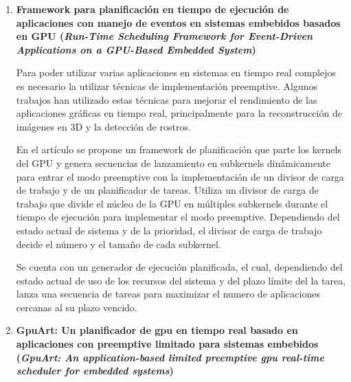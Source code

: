 \begin{enumerate}
\item \textbf{Framework para planificación en tiempo de ejecución de aplicaciones con manejo de eventos en sistemas embebidos basados en GPU 
	(\textit{Run-Time Scheduling Framework for Event-Driven Applications on a GPU-Based Embedded System})}
	
	Para poder utilizar varias aplicaciones en sistemas en tiempo real complejos es necesario la utilizar técnicas de implementación preemptive. Algunos trabajos han utilizado estas técnicas para mejorar el rendimiento de las aplicaciones gráficas en tiempo real, principalmente para la reconstrucción de imágenes en 3D y la detección de rostros.

\vspace{0.3cm}

En el artículo \cite{RTFG} se propone un framework de planificación que parte los kernels del GPU y genera secuencias de lanzamiento en subkernels dinámicamente para entrar el modo preemptive con la implementación de un divisor de carga de trabajo y de un planificador de tareas. Utiliza un divisor de carga de trabajo que divide el núcleo de la GPU en múltiples subkernels durante el tiempo de ejecución para implementar el modo preemptive. Dependiendo del estado actual de sistema y de la prioridad, el divisor de carga de trabajo decide el número y el tamaño de cada subkernel. 

\vspace{0.3cm}

Se cuenta con un generador de ejecución planificada, el cual, dependiendo del estado actual de uso de los recursos del sistema y del plazo límite del la tarea, lanza una secuencia de tareas para maximizar el numero de aplicaciones cercanas al su plazo vencido.	
	
\item \textbf{GpuArt: Un planificador de gpu en tiempo real basado en aplicaciones con preemptive limitado para sistemas embebidos
	(\textit{GpuArt: An application-based limited preemptive gpu real-time scheduler for embedded systems})}
\end{enumerate}  	

